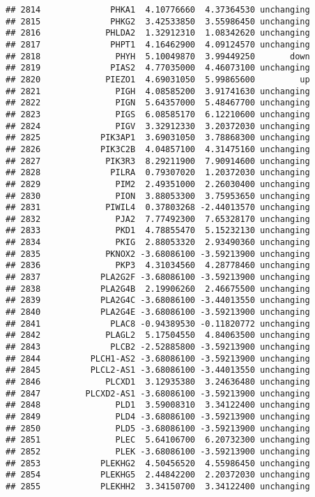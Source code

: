\documentclass[]{article}
\begin{document}
\begin{verbatim}
## 2814              PHKA1  4.10776660  4.37364530 unchanging
## 2815              PHKG2  3.42533850  3.55986450 unchanging
## 2816             PHLDA2  1.32912310  1.08342620 unchanging
## 2817              PHPT1  4.16462900  4.09124570 unchanging
## 2818               PHYH  5.10049870  3.99449250       down
## 2819              PIAS2  4.77035000  4.46073100 unchanging
## 2820             PIEZO1  4.69031050  5.99865600         up
## 2821               PIGH  4.08585200  3.91741630 unchanging
## 2822               PIGN  5.64357000  5.48467700 unchanging
## 2823               PIGS  6.08585170  6.12210600 unchanging
## 2824               PIGV  3.32912330  3.20372030 unchanging
## 2825            PIK3AP1  3.69031050  3.78868300 unchanging
## 2826            PIK3C2B  4.04857100  4.31475160 unchanging
## 2827             PIK3R3  8.29211900  7.90914600 unchanging
## 2828              PILRA  0.79307020  1.20372030 unchanging
## 2829               PIM2  2.49351000  2.26030400 unchanging
## 2830               PION  3.88053300  3.75953650 unchanging
## 2831             PIWIL4  0.37803268 -2.44013570 unchanging
## 2832               PJA2  7.77492300  7.65328170 unchanging
## 2833               PKD1  4.78855470  5.15232130 unchanging
## 2834               PKIG  2.88053320  2.93490360 unchanging
## 2835             PKNOX2 -3.68086100 -3.59213900 unchanging
## 2836               PKP3  4.31034560  4.28778460 unchanging
## 2837            PLA2G2F -3.68086100 -3.59213900 unchanging
## 2838            PLA2G4B  2.19906260  2.46675500 unchanging
## 2839            PLA2G4C -3.68086100 -3.44013550 unchanging
## 2840            PLA2G4E -3.68086100 -3.59213900 unchanging
## 2841              PLAC8 -0.94389530 -0.11820772 unchanging
## 2842             PLAGL2  5.17504550  4.84063500 unchanging
## 2843              PLCB2 -2.52885800 -3.59213900 unchanging
## 2844          PLCH1-AS2 -3.68086100 -3.59213900 unchanging
## 2845          PLCL2-AS1 -3.68086100 -3.44013550 unchanging
## 2846             PLCXD1  3.12935380  3.24636480 unchanging
## 2847         PLCXD2-AS1 -3.68086100 -3.59213900 unchanging
## 2848               PLD1  3.59008310  3.34122400 unchanging
## 2849               PLD4 -3.68086100 -3.59213900 unchanging
## 2850               PLD5 -3.68086100 -3.59213900 unchanging
## 2851               PLEC  5.64106700  6.20732300 unchanging
## 2852               PLEK -3.68086100 -3.59213900 unchanging
## 2853            PLEKHG2  4.50456520  4.55986450 unchanging
## 2854            PLEKHG5  2.44842200  2.20372030 unchanging
## 2855            PLEKHH2  3.34150700  3.34122400 unchanging

\end{verbatim}
\end{document}
